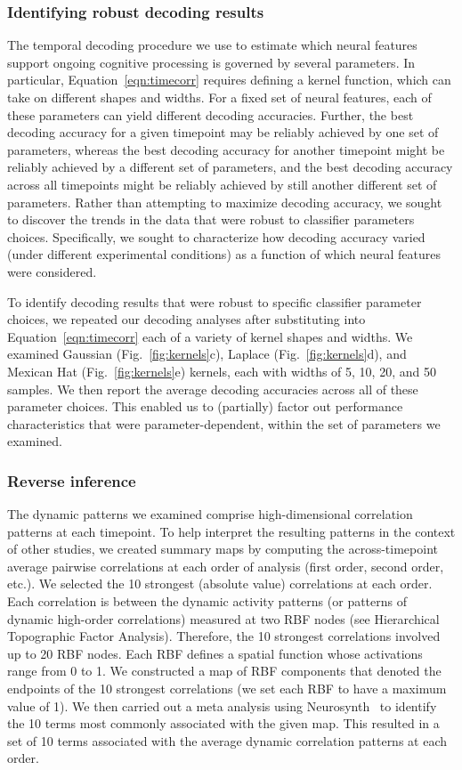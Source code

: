\documentclass[english]{article}
\begin{document}
\subsubsection*{Identifying robust decoding results}
The temporal decoding procedure we use to estimate which neural
features support ongoing cognitive processing is governed by several
parameters. In particular, Equation~\ref{eqn:timecorr} requires
defining a kernel function, which can take on different shapes and
widths.  For a fixed set of neural features, each of these parameters
can yield different decoding accuracies.  Further, the best decoding
accuracy for a given timepoint may be reliably achieved by one set of
parameters, whereas the best decoding accuracy for another timepoint
might be reliably achieved by a different set of parameters, and the
best decoding accuracy across all timepoints might be
reliably achieved by still another different set of parameters.
Rather than attempting to maximize decoding accuracy, we sought to
discover the trends in the data that were robust to classifier
parameters choices.  Specifically, we sought to characterize how
decoding accuracy varied (under different experimental conditions) as
a function of which neural features were considered.

To identify decoding results that were robust to specific classifier
parameter choices, we repeated our decoding analyses after
substituting into Equation~\ref{eqn:timecorr} each of a variety of
kernel shapes and widths.  We examined Gaussian
(Fig.~\ref{fig:kernels}c), Laplace (Fig.~\ref{fig:kernels}d), and
Mexican Hat (Fig.~\ref{fig:kernels}e) kernels, each with widths of 5,
10, 20, and 50 samples.  We then report the average decoding
accuracies across all of these parameter choices.  This enabled us to
(partially) factor out performance characteristics that were
parameter-dependent, within the set of parameters we examined.


\subsubsection*{Reverse inference}
The dynamic patterns we examined comprise high-dimensional correlation
patterns at each timepoint.  To help interpret the resulting patterns
in the context of other studies, we created summary maps by computing
the across-timepoint average pairwise correlations at each order of
analysis (first order, second order, etc.).  We selected the 10
strongest (absolute value) correlations at each order.  Each
correlation is between the dynamic activity patterns (or patterns of
dynamic high-order correlations) measured at two RBF nodes (see
Hierarchical Topographic Factor Analysis).  Therefore, the 10
strongest correlations involved up to 20 RBF nodes.  Each RBF defines
a spatial function whose activations range from 0 to 1.  We
constructed a map of RBF components that denoted the endpoints of the
10 strongest correlations (we set each RBF to have a maximum value of
1).  We then carried out a meta analysis using
Neurosynth~\cite{RubiEtal17} to identify the 10 terms most commonly
associated with the given map.  This resulted in a set of 10 terms
associated with the average dynamic correlation patterns at each
order.
\end{document}
